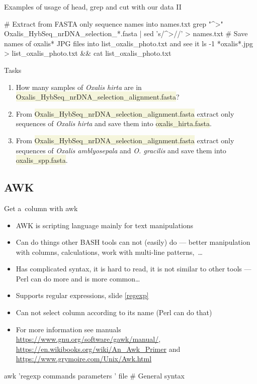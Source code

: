 \documentclass[compress, xelatex, 11pt, xcolor=svgnames, aspectratio=169, url={hyphens, lowtilde}]{beamer}
\renewcommand{\texttt}[1]{\colorbox{Beige}{{\ttfamily #1}}}
\begin{document}
\begin{frame}[fragile]{Examples of usage of head, grep and cut with our data II}
	\begin{bashcode}
    # Extract from FASTA only sequence names into names.txt
    grep "^>" Oxalis_HybSeq_nrDNA_selection_*.fasta | sed 's/^>//' > names.txt
    # Save names of oxalis* JPG files into list_oxalis_photo.txt and see it
    ls -1 *oxalis*.jpg > list_oxalis_photo.txt && cat list_oxalis_photo.txt
	\end{bashcode}
	\begin{block}{Tasks}
		\begin{enumerate}
			\item How many samples of \textit{Oxalis hirta} are in \texttt{Oxalis\_HybSeq\_nrDNA\_selection\_alignment.fasta}?
			\item From \texttt{Oxalis\_HybSeq\_nrDNA\_selection\_alignment.fasta} extract only sequences of \textit{Oxalis hirta} and save them into \texttt{oxalis\_hirta.fasta}.
			\item From \texttt{Oxalis\_HybSeq\_nrDNA\_selection\_alignment.fasta} extract only sequences of \textit{Oxalis amblyosepala} and \textit{O. gracilis} and save them into \texttt{oxalis\_spp.fasta}.
		\end{enumerate}
	\end{block}
\end{frame}

\subsection{AWK}

\begin{frame}[fragile]{Get a~column with awk}
	\begin{itemize}
		\item AWK is scripting language mainly for text manipulations
		\item Can do things other BASH tools can not (easily) do --- better manipulation with columns, calculations, work with multi-line patterns,~\ldots
		\item Has complicated syntax, it is hard to read, it is not similar to other tools --- Perl can do more and is more common\ldots
		\item Supports regular expressions, slide \ref{regexp}
		\item Can not select column according to its name (Perl can do that)
		\item For more information see manuals \url{https://www.gnu.org/software/gawk/manual/}, \url{https://en.wikibooks.org/wiki/An_Awk_Primer} and \url{https://www.grymoire.com/Unix/Awk.html}
	\end{itemize}
	\vfill
	\begin{bashcode}
    awk 'regexp { commands parameters }' file # General syntax
	\end{bashcode}
\end{frame}
\end{document}
